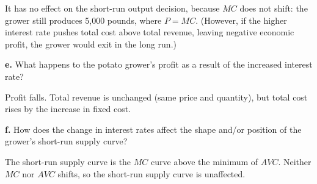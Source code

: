 \documentclass[11pt,a4paper]{article}
\newif\ifsolutions
\newcommand{\ans}[1]{\ifsolutions\else\par\vspace{0pt plus #1fill}\fi}
\begin{document}
\begin{enumerate}
\begin{solution}
It has no effect on the short-run output decision, because $MC$ does not shift: the grower still produces 5,000 pounds, where $P = MC$. (However, if the higher interest rate pushes total cost above total revenue, leaving negative economic profit, the grower would exit in the long run.)
\end{solution}

\noindent\textbf{e.} What happens to the potato grower's profit as a result of the increased interest rate?
\ans{0.8}

\begin{solution}
Profit falls. Total revenue is unchanged (same price and quantity), but total cost rises by the increase in fixed cost.
\end{solution}

\noindent\textbf{f.} How does the change in interest rates affect the shape and/or position of the grower's short-run supply curve?
\ans{1}

\begin{solution}
The short-run supply curve is the $MC$ curve above the minimum of $AVC$. Neither $MC$ nor $AVC$ shifts, so the short-run supply curve is unaffected.
\end{solution}
\end{enumerate}
\end{document}
